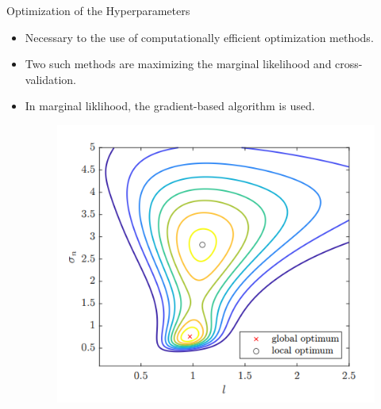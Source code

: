 \begin{frame}{Optimization of the Hyperparameters\cite{Lubsen2022}}
    \begin{itemize}
        \item Necessary to the use of computationally efficient optimization methods.
        \item Two such methods are maximizing the marginal likelihood and cross-validation. %
        \item In marginal liklihood, the gradient-based algorithm is used.
\begin{figure}
    \centering
    \includegraphics[width=0.35\linewidth]{figures/GP/Contour_hyp.png}
    \label{fig:opt_hyp_post}

\end{figure}





    \end{itemize}
\end{frame}


